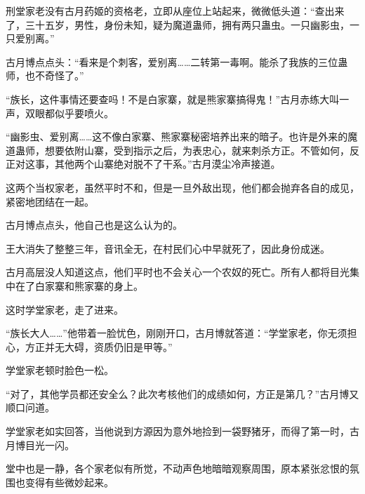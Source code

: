 \begin{this_body}
刑堂家老没有古月药姬的资格老，立即从座位上站起来，微微低头道：“查出来了，三十五岁，男性，身份未知，疑为魔道蛊师，拥有两只蛊虫。一只幽影虫，一只爱别离。”

古月博点点头：“看来是个刺客，爱别离……二转第一毒啊。能杀了我族的三位蛊师，也不奇怪了。”

“族长，这件事情还要查吗！不是白家寨，就是熊家寨搞得鬼！”古月赤练大叫一声，双眼都似乎要喷火。

“幽影虫、爱别离……这不像白家寨、熊家寨秘密培养出来的暗子。也许是外来的魔道蛊师，想要依附山寨，受到指示之后，为表忠心，就来刺杀方正。不管如何，反正对这事，其他两个山寨绝对脱不了干系。”古月漠尘冷声接道。

这两个当权家老，虽然平时不和，但是一旦外敌出现，他们都会抛弃各自的成见，紧密地团结在一起。

古月博点点头，他自己也是这么认为的。

王大消失了整整三年，音讯全无，在村民们心中早就死了，因此身份成迷。

古月高层没人知道这点，他们平时也不会关心一个农奴的死亡。所有人都将目光集中在了白家寨和熊家寨的身上。

这时学堂家老，走了进来。

“族长大人……”他带着一脸忧色，刚刚开口，古月博就答道：“学堂家老，你无须担心，方正并无大碍，资质仍旧是甲等。”

学堂家老顿时脸色一松。

“对了，其他学员都还安全么？此次考核他们的成绩如何，方正是第几？”古月博又顺口问道。

学堂家老如实回答，当他说到方源因为意外地捡到一袋野猪牙，而得了第一时，古月博目光一闪。

堂中也是一静，各个家老似有所觉，不动声色地暗暗观察周围，原本紧张忿恨的氛围也变得有些微妙起来。

\end{this_body}

